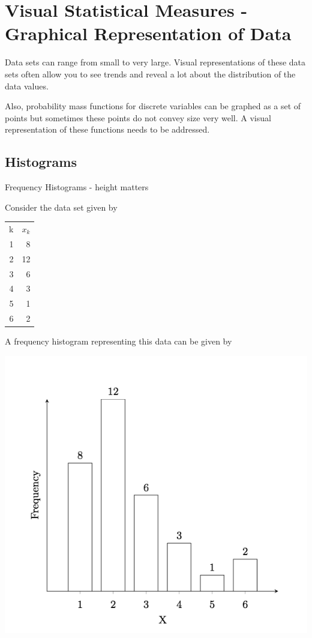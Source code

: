 \documentclass[10pt,]{book}
\theoremstyle{plain}
\theoremstyle{definition}
\theoremstyle{definition}
\theoremstyle{definition}
\numberwithin{equation}{section}
\newcommand{\hrulemedium}{\noalign{\hrule height 0.07em}}
\begin{document}
\section[{Visual Statistical Measures - Graphical Representation of Data}]{Visual Statistical Measures - Graphical Representation of Data}\label{section-8}
Data sets can range from small to very large. Visual representations of these data sets often allow you to see trends and reveal a lot about the distribution of the data values.%
\par

Also, probability mass functions for discrete variables can be graphed as a set of points but sometimes these points do not convey size very well. A visual representation of these functions needs to be addressed.
%
\typeout{************************************************}
\typeout{************************************************}
\subsection[{Histograms}]{Histograms}\label{subsection-1}
Frequency Histograms - height matters%
\par
Consider the data set given by
		
\leavevmode%
\begin{table}
\centering
\begin{tabular}{rr}
k&\(x_k\)\tabularnewline\hrulemedium
1&8\tabularnewline[0pt]
2&12\tabularnewline[0pt]
3&6\tabularnewline[0pt]
4&3\tabularnewline[0pt]
5&1\tabularnewline[0pt]
6&2
\end{tabular}
\end{table}

	
A frequency histogram representing this data can be given by

\includegraphics[width=1\linewidth]{images/frequencyhistogram.png}
\end{document}
